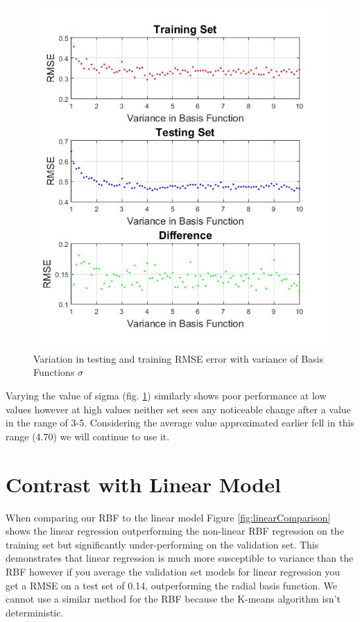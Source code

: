 \documentclass[a4paper,10pt, twocolumn]{article}
\begin{document}
\begin{figure}[ht]
	\includegraphics[width=0.7\linewidth]{VaryingSigma.jpg}
	\centering
	\caption{Variation in testing and training RMSE error with variance of Basis Functions $\sigma$}
		\label{fig:varyingSigma}
\end{figure}

Varying the value of sigma (fig. \ref{fig:varyingSigma}) similarly shows poor performance at low values however at high values neither set sees any noticeable change after a value in the range of 3-5. Considering the average value approximated earlier fell in this range (4.70) we will continue to use it.

\section{Contrast with Linear Model}

When comparing our RBF to the linear model Figure \ref{fig:linearComparison} shows the linear regression outperforming the non-linear RBF regression on the training set but significantly under-performing on the validation set. This demonstrates that linear regression is much more susceptible to variance than the RBF however if you average the validation set models for linear regression you get a RMSE on a test set of 0.14, outperforming the radial basis function. We cannot use a similar method for the RBF because the K-means algorithm isn't deterministic. 
\end{document}
